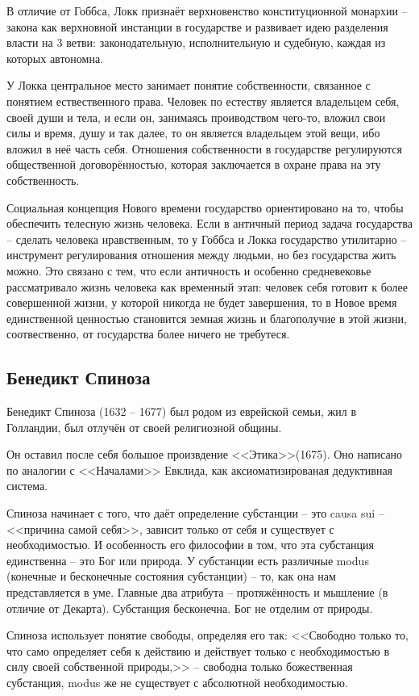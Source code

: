 \documentclass[a4paper, 12pt]{book} %
\begin{document}
В отличие от Гоббса, Локк признаёт верхновенство конституционной монархии -- закона как верхновной инстанции в государстве и развивает идею разделения власти на 3 ветви: законодательную, исполнительную и судебную, каждая из которых автономна.

У Локка центральное место занимает понятие собственности, связанное с понятием ествественного права. Человек по естеству является владельцем себя, своей души и тела, и если он, занимаясь проиводством чего-то, вложил свои силы и время, душу и так далее, то он является владельцем этой вещи, ибо вложил в неё часть себя. Отношения собственности в государстве регулируются общественной договорённостью, которая заключается в охране права на эту собственность.

Социальная концепция Нового времени государство ориентировано на то, чтобы обеспечить телесную жизнь человека. Если в античный период задача государства -- сделать человека нравственным, то у Гоббса и Локка государство утилитарно -- инструмент регулирования отношения между людьми, но без государства жить можно.	Это связано с тем, что если античность и особенно средневековье рассматривало жизнь человека как временный этап: человек себя готовит к более совершенной жизни, у которой никогда не будет завершения, то в Новое время единственной ценностью становится земная жизнь и благополучие в этой жизни, соотвественно, от государства более ничего не требутеся.

\subsection{Бенедикт Спиноза}
Бенедикт Спиноза (1632 --  1677) был родом из еврейской семьи, жил в Голландии, был отлучён от своей религиозной общины.

Он оставил после себя большое произвдение <<Этика>>(1675). Оно написано по аналогии с <<Началами>> Евклида, как аксиоматизированая дедуктивная система. 

Спиноза начинает с того, что даёт определение субстанции -- это causa sui -- <<причина самой себя>>, зависит только от себя и существует с необходимостью. И особенность его философии в том, что эта субстанция единственна -- это Бог или природа. У субстанции есть различные modus (конечные и бесконечные состояния субстанции) -- то, как она нам представляется в уме. Главные два атрибута -- протяжённость и мышление (в отличие от Декарта). Субстанция бесконечна. Бог не отделим от природы. 

Спиноза использует понятие свободы, определяя его так: <<Свободно только то, что само определяет себя к действию и действует только с необходимостью в силу своей собственной природы,>> -- свободна только божественная субстанция, modus же не существует с абсолютной необходимостью. 
\end{document}
